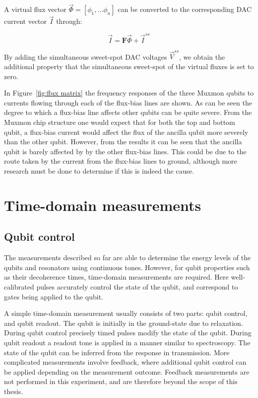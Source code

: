         A virtual flux vector $\vec{\Phi}=\left[ \phi_1, \dots \phi_n \right]$ can be converted to the corresponding DAC current vector $\vec{I}$ through:

        \begin{equation}
          \vec{I} = \boldsymbol{F} \vec{\Phi} + \vec{I}^{ss}
        \end{equation}

        By adding the simultaneous sweet-spot DAC voltages $\vec{V}^{ss}$, we obtain the additional property that the simultaneous sweet-spot of the virtual fluxes is set to zero.

        In Figure~\ref{fig:flux matrix} the frequency responses of the three Muxmon qubits to currents flowing through each of the flux-bias lines are shown. As can be seen the degree to which a flux-bias line affects other qubits can be quite severe. From the Muxmon chip structure one would expect that for both the top and bottom qubit, a flux-bias current would affect the flux  of the ancilla qubit more severely than the other qubit. However, from the results it can be seen that the ancilla qubit is barely affected by by the other flux-bias lines. This could be due to the route taken by the current from the flux-bias lines to ground, although more research must be done to determine if this is indeed the cause.

    \section{Time-domain measurements}
      \label{sec:Time-domain measurements}
      \subsection{Qubit control}
        \label{ssec:qubit control}
        The measurements described so far are able to determine the energy levels of the qubits and resonators using continuous tones. However, for qubit properties such as their decoherence times, time-domain measurements are required. Here well-calibrated pulses accurately control the state of the qubit, and correspond to gates being applied to the qubit.

        A simple time-domain measurement usually consists of two parts: qubit control, and qubit readout. The qubit is initially in the ground-state due to relaxation. During qubit control precisely timed pulses modify the state of the qubit. During qubit readout a readout tone is applied in a manner similar to spectroscopy. The state of the qubit can be inferred from the response in transmission. More complicated measurements involve feedback, where additional qubit control can be applied depending on the measurement outcome. Feedback measurements are not performed in this experiment, and are therefore beyond the scope of this thesis.

